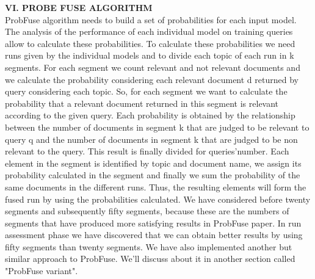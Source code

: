 \documentclass[12pt,journal]{IEEEtran}
\begin{document}
\textbf{VI.	PROBE FUSE ALGORITHM} \\
ProbFuse algorithm needs to build a set of probabilities for each input model. 
The analysis of the performance of each individual model on training queries allow to calculate these probabilities. 
To calculate these probabilities we need runs given by the individual models and to divide each topic of each run in k segments. For each segment we count relevant and not relevant documents and we calculate the probability considering each relevant document d returned by query considering each topic. 
So, for each segment we want to calculate the probability that a relevant document returned in this segment is relevant according to the given query. Each probability is obtained by the relationship between the number of documents in segment k that are judged to be relevant to query q and the number of documents in segment k that are judged to be non relevant to the query. This result is finally divided for queries'number.
Each element in the segment is identified by topic and document name, we assign its probability calculated in the segment and finally we sum the probability of the same documents in the different runs.
Thus, the resulting elements will form the fused run by using the probabilities calculated. 
We have considered before twenty segments and subsequently fifty segments, because these are the numbers of segments that have produced more satisfying results in ProbFuse paper. In run assessment phase we have discovered that we can obtain better results by using fifty segments than twenty segments. We have also implemented another but similar approach to ProbFuse. We'll discuss about it in another section called "ProbFuse variant". \\
\end{document}
